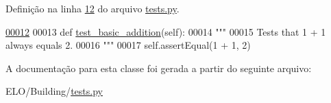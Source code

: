 Definição na linha \hyperlink{Building_2tests_8py_source_l00012}{12} do arquivo \hyperlink{Building_2tests_8py_source}{tests.\-py}.


\begin{DoxyCode}
\hypertarget{classBuilding_1_1tests_1_1SimpleTest_l00012}{}\hyperlink{classBuilding_1_1tests_1_1SimpleTest_ab0e4899c8d53d334ffdff4c5e40e2962}{00012} 
00013     \textcolor{keyword}{def }\hyperlink{classBuilding_1_1tests_1_1SimpleTest_ab0e4899c8d53d334ffdff4c5e40e2962}{test\_basic\_addition}(self):
00014         \textcolor{stringliteral}{"""}
00015 \textcolor{stringliteral}{        Tests that 1 + 1 always equals 2.}
00016 \textcolor{stringliteral}{        """}
00017         self.assertEqual(1 + 1, 2)
\end{DoxyCode}


A documentação para esta classe foi gerada a partir do seguinte arquivo\-:\begin{DoxyCompactItemize}
\item 
E\-L\-O/\-Building/\hyperlink{Building_2tests_8py}{tests.\-py}\end{DoxyCompactItemize}
